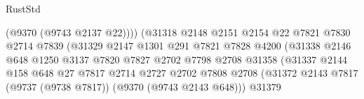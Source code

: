 \begin{lexlean}{RustStd}
\begin{coremodule}
{\begin{coremodule}
{{{{{{{{{{{{{{{{{{{{{{{{{{{{{{{{{{{{{{{                                                  (@9370 (@9743 @2137 @22))))
                                              (@31318
                                                @2148
                                                @2151
                                                @2154
                                                @22
                                                @7821
                                                @7830
                                                @2714
                                                @7839
                                                (@31329
                                                  @2147
                                                  @1301
                                                  @291
                                                  @7821
                                                  @7828
                                                  @4200
                                                  (@31338
                                                    @2146
                                                    @648
                                                    @1250
                                                    @3137
                                                    @7820
                                                    @7827
                                                    @2702
                                                    @7798
                                                    @2708
                                                    @31358
                                                    (@31337
                                                      @2144
                                                      @158
                                                      @648
                                                      @27
                                                      @7817
                                                      @2714
                                                      @2727
                                                      @2702
                                                      @7808
                                                      @2708
                                                      (@31372
                                                        @2143
                                                        @7817
                                                        (@9737 (@9738 @7817))
                                                        (@9370 (@9743 @2143 @648)))
                                                      @31379
}}}}}}}}}}}}}}}}}}}}}}}}}}}}}}}}}}}}}}}
\end{coremodule}}
\end{coremodule}
\end{lexlean}
